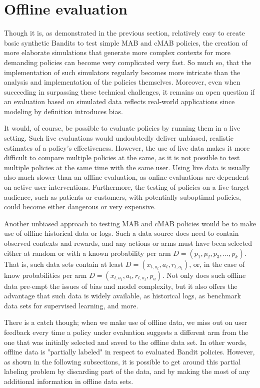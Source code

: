 \documentclass[nojss]{jss}\usepackage[]{graphicx}\usepackage[]{color}
\begin{document}
\section{Offline evaluation}

Though it is, as demonstrated in the previous section, relatively easy to create basic synthetic Bandits to test simple MAB and cMAB policies, the creation of more elaborate simulations that generate more complex contexts for more demanding policies can become very complicated very fast. So much so, that the implementation of such simulators regularly becomes more intricate than the analysis and implementation of the policies themselves. Moreover, even when succeeding in surpassing these technical challenges, it remains an open question if an evaluation based on simulated data reflects real-world applications since modeling by definition introduces bias.

It would, of course, be possible to evaluate policies by running them in a live setting. Such live evaluations would undoubtedly deliver unbiased, realistic estimates of a policy's effectiveness. However, the use of live data makes it more difficult to compare multiple policies at the same, as it is not possible to test multiple policies at the same time with the same user. Using live data is usually also much slower than an offline evaluation, as online evaluations are dependent on active user interventions. Furthermore, the testing of policies on a live target audience, such as patients or customers, with potentially suboptimal policies, could become either dangerous or very expensive.

Another unbiased approach to testing MAB and cMAB policies would be to make use of offline historical data or logs. Such a data source does need to contain observed contexts and rewards, and any actions or arms must have been selected either at random or with a known probability per arm \( D = (p_1,p_2,p_3,...,p_k) \). That is, such data sets contain at least \( D = (x_{t,a_t},a_{t},r_{t,a_t}) \), or, in the case of know probabilities per arm \( D = (x_{t,a_t},a_{t},r_{t,a_t},p_a) \). Not only does such offline data pre-empt the issues of bias and model complexity, but it also offers the advantage that such data is widely available, as historical logs, as benchmark data sets for supervised learning, and more.

There is a catch though; when we make use of offline data, we miss out on user feedback every time a policy under evaluation suggests a different arm from the one that was initially selected and saved to the offline data set. In other words, offline data is "partially labeled" in respect to evaluated Bandit policies. However, as shown in the following subsections, it is possible to get around this partial labeling problem by discarding part of the data, and by making the most of any additional information in offline data sets.
\end{document}
